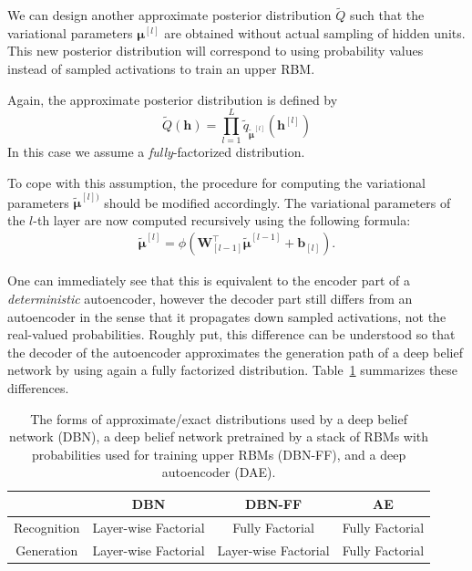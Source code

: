 \documentclass{now}
\newcommand{\qlay}[1]{\left[#1\right]}
\newcommand{\vect}[1]{\mathbf{#1}}
\newcommand{\vects}[1]{\boldsymbol{#1}}
\newcommand{\matr}[1]{\mathbf{#1}}
\newcommand{\vb}[0]{\vect{b}}
\newcommand{\vh}[0]{\vect{h}}
\newcommand{\mW}[0]{\matr{W}}
\newcommand{\vmu}[0]{\vects{\mu}}
\begin{document}
We can design another approximate posterior distribution
$\tilde{Q}$ such that the variational parameters
$\vmu^{\qlay{l}}$ are obtained without actual sampling of hidden
units. This new posterior distribution will correspond to
using probability values instead of sampled activations to
train an upper RBM.

Again, the approximate posterior distribution is defined by
\[
\tilde{Q}(\vh) = \prod_{l=1}^L \tilde{q}_{\tilde{\vmu}^{\qlay{l}}}\left(
\vh^{\qlay{l}} \right)
\]
In this case we assume a \textit{fully}-factorized
distribution. 

To cope with this assumption, the procedure for computing
the variational parameters $\tilde{\vmu}^{\qlay{l})}$ should
be modified accordingly.  The variational parameters of the
$l$-th layer are now computed recursively using the
following formula: 
\begin{align}
    \label{eq:dbn_posterior_ff}
    \tilde{\vmu}^{\qlay{l}} = \phi\left( \mW_{\qlay{l-1}}^\top
    \tilde{\vmu}^{\qlay{l-1}} + \vb_{\qlay{l}} \right).
\end{align}

One can immediately see that this is equivalent to the
encoder part of a \textit{deterministic} autoencoder, 
however the decoder part still differs from an autoencoder
in the sense that it propagates down sampled activations,
not the real-valued probabilities.  Roughly put, this
difference can be understood so that the decoder of the
autoencoder approximates the generation path of a deep
belief network by using again a fully factorized distribution.
Table~\ref{tbl:dbn_ae} summarizes these differences.

\begin{table}[h]
\vskip 0.15in
    \centering
    \begin{tabular}{c || c | c | c}
        & DBN & DBN-FF & AE \\
        \hline
        \hline
        Recognition & Layer-wise Factorial & Fully Factorial & Fully Factorial \\
        \hline
        Generation & Layer-wise Factorial & Layer-wise Factorial & Fully Factorial \\
    \end{tabular}
    \caption{The forms of approximate/exact 
    distributions used by a deep belief network (DBN), a
    deep belief network pretrained by a stack of RBMs with
    probabilities used for training upper RBMs (DBN-FF), and
    a deep autoencoder (DAE).}
    \label{tbl:dbn_ae}
\end{table}
\end{document}

